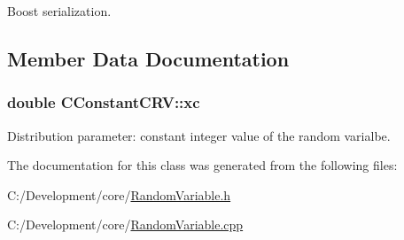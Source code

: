 Boost serialization. 



\subsection{Member Data Documentation}
\hypertarget{class_c_constant_c_r_v_a2a82360ef61c3c3ea5b4728f82f3e489}{
\subsubsection[{xc}]{\setlength{\rightskip}{0pt plus 5cm}double C\-Constant\-C\-R\-V\-::xc\hspace{0.3cm}{\ttfamily [private]}}}\label{class_c_constant_c_r_v_a2a82360ef61c3c3ea5b4728f82f3e489}
Distribution parameter\-: constant integer value of the random varialbe. 

The documentation for this class was generated from the following files\-:\begin{DoxyCompactItemize}
\item 
C\-:/\-Development/core/\hyperlink{_random_variable_8h}{Random\-Variable.\-h}\item 
C\-:/\-Development/core/\hyperlink{_random_variable_8cpp}{Random\-Variable.\-cpp}\end{DoxyCompactItemize}
